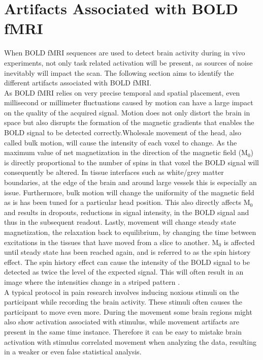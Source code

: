\section{Artifacts Associated with BOLD fMRI} \label{sec:noise}

When BOLD fMRI sequences are used to detect brain activity during in vivo experiments, not only task related activation will be present, as sources of noise  inevitably will impact the scan. \cite{Salimi-Khorshidi2014} The following section aims to identify the different artifacts associated with BOLD fMRI. \\
As BOLD fMRI relies on very precise temporal and spatial placement, even millisecond or millimeter fluctuations caused by motion can have a large impact on the quality of the acquired signal. Motion does not only distort the brain in space but also disrupts the formation of the magnetic gradients that enables the BOLD signal to be detected correctly.Wholesale movement of the head, also called bulk motion, will cause the intensity of each voxel to change. As the maximum value of net magnetization in the direction of the magnetic field (M$_0$) is directly proportional to the number of spins in that voxel the BOLD signal will consequently be altered. In tissue interfaces such as white/grey matter boundaries, at the edge of the brain and around large vessels this is especially an issue. Furthermore, bulk motion will change the uniformity of the magnetic field as is has been tuned for a particular head position. This also directly affects M$_0$ and results in dropouts, reductions in signal intensity, in the BOLD signal and thus in the subsequent readout. Lastly, movement will change steady state magnetization, the relaxation back to equilibrium, by changing the time between excitations in the tissues that have moved from a slice to another. M$_0$ is affected until steady state has been reached again, and is referred to as the spin history effect. The spin history effect can cause the intensity of the BOLD signal to be detected as twice the level of the expected signal. \cite{Murphy2013} This will often result in an image where the intensities change in a striped pattern \cite{Poldrack2011}. \\
A typical protocol in pain research involves inducing noxious stimuli on the participant while recording the brain activity. These stimuli often causes the participant to move even more. During the movement some brain regions might also show activation associated with stimulus, while movement artifacts are present in the same time instance. Therefore it can be easy to mistake brain activation with stimulus correlated movement when analyzing the data, resulting in a weaker or even false statistical analysis. \cite{Poldrack2011} \\
